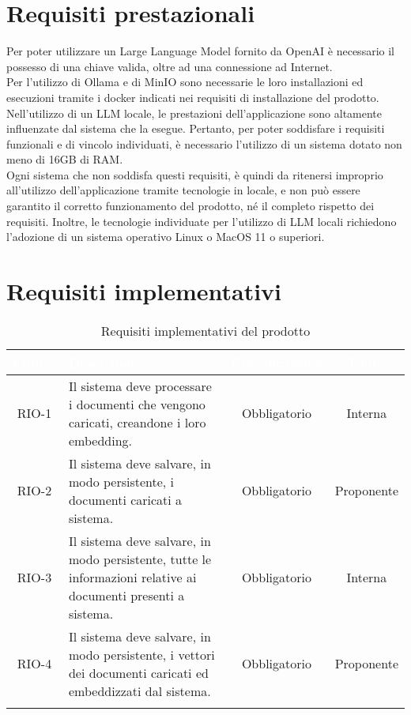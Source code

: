 \section{Requisiti prestazionali}
Per poter utilizzare un Large Language Model fornito da OpenAI è necessario il possesso di una chiave  valida, oltre ad una connessione ad Internet.\\
Per l'utilizzo di Ollama e di MinIO sono necessarie le loro installazioni ed esecuzioni tramite i docker indicati nei requisiti di installazione del prodotto.
Nell'utilizzo di un LLM locale, le prestazioni dell'applicazione sono altamente influenzate dal sistema che la esegue. Pertanto, per poter soddisfare i requisiti funzionali e di vincolo individuati, è necessario l'utilizzo di un sistema dotato non meno di 16GB di RAM.\\
Ogni sistema che non soddisfa questi requisiti, è quindi da ritenersi improprio all'utilizzo dell'applicazione tramite tecnologie in locale, e non può essere garantito il corretto funzionamento del prodotto, né il completo rispetto dei requisiti. Inoltre, le tecnologie individuate per l'utilizzo di LLM locali richiedono l'adozione di un sistema operativo Linux o MacOS 11 o superiori.

\section{Requisiti implementativi}
\begingroup
\setlength{\tabcolsep}{10pt}
\renewcommand{\arraystretch}{1.5}
\begin{xltabular}{\textwidth}{| c | X | c | c |}
    \hline
     \textbf{\textcolor{white}{Codice}} & \textbf{\textcolor{white}{Descrizione}} & \textbf{\textcolor{white}{Classificazione}} & \textbf{\textcolor{white}{Fonte}}\\
    \hline
    \endhead
    RIO-1 & Il sistema deve processare i documenti che vengono caricati, creandone i loro embedding. & Obbligatorio & Interna\\
    \hline
    RIO-2 & Il sistema deve salvare, in modo persistente, i documenti caricati a sistema. & Obbligatorio & Proponente\\
    \hline
    RIO-3 & Il sistema deve salvare, in modo persistente, tutte le informazioni relative ai documenti presenti a sistema. & Obbligatorio & Interna\\
    \hline
    RIO-4 & Il sistema deve salvare, in modo persistente, i vettori dei documenti caricati ed embeddizzati dal sistema. & Obbligatorio & Proponente\\
    \hline
    
     \caption{Requisiti implementativi del prodotto}
    \label{tab:reqimp}
\end{xltabular}
\endgroup
\newpage
